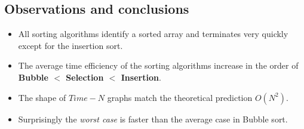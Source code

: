 \documentclass[11pt]{article}
\begin{document}
\subsection{Observations and conclusions}
\begin{itemize}
\item All sorting algorithms identify a sorted array and terminates very quickly except for the insertion sort.
\item The average time efficiency of the sorting algorithms increase in the order of\\ \textbf{Bubble $<$ Selection $<$ Insertion}.
\item The shape of $Time-N$ graphs match the theoretical prediction $O(N^2)$.
\item Surprisingly the \textit{worst case} is faster than the average case in Bubble sort.
\end{itemize}
\end{document}
